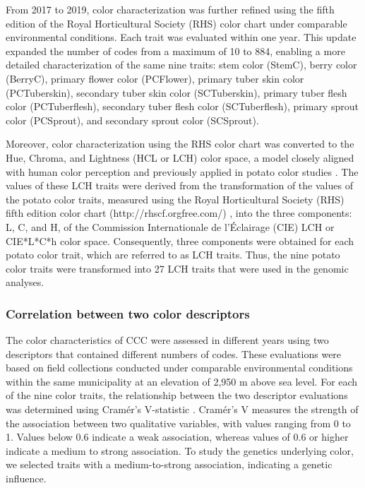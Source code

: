 \documentclass[pdflatex,sn-mathphys-ay]{sn-jnl}%
\begin{document}
From 2017 to 2019, color characterization was further refined using the fifth edition of the Royal Horticultural Society (RHS) color chart \citep{voss2002royal} under comparable environmental conditions. Each trait was evaluated within one year. This update expanded the number of codes from a maximum of 10 to 884, enabling a more detailed characterization of the same nine traits: stem color (StemC), berry color (BerryC), primary flower color (PCFlower), primary tuber skin color (PCTuberskin), secondary tuber skin color (SCTuberskin), primary tuber flesh color (PCTuberflesh), secondary tuber flesh color (SCTuberflesh), primary sprout color (PCSprout), and secondary sprout color (SCSprout).


Moreover, color characterization using the RHS color chart was converted to the Hue, Chroma, and Lightness (HCL or LCH) color space, a model closely aligned with human color perception and previously applied in potato color studies \citep{caraza2020image}. The values of these LCH traits were derived from the transformation of the values of the potato color traits, measured using the Royal Horticultural Society (RHS) fifth edition color chart (http://rhscf.orgfree.com/) \citep{voss2002royal}, into the three components: L, C, and H, of the Commission Internationale de l'Éclairage (CIE) LCH or CIE{*}L{*}C{*}h color space. Consequently, three components were obtained for each potato color trait, which are referred to as LCH traits. Thus, the nine potato color traits were transformed into 27 LCH traits that were used in the genomic analyses. 



\subsubsection{Correlation between two color descriptors}
The color characteristics of CCC were assessed in different years using two descriptors that contained different numbers of codes. These evaluations were based on field collections conducted under comparable environmental conditions within the same municipality at an elevation of 2,950 m above sea level. For each of the nine color traits, the relationship between the two descriptor evaluations was determined using Cramér’s V-statistic \citep{Lyman1986}. Cramér’s V measures the strength of the association between two qualitative variables, with values ranging from 0 to 1. Values below 0.6 indicate a weak association, whereas values of 0.6 or higher indicate a medium to strong association. To study the genetics underlying color, we selected traits with a medium-to-strong association, indicating a genetic influence.
\end{document}

